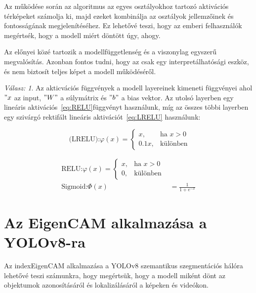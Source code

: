 \documentclass[12pt,oneside,a4paper]{article}
\newcommand{\newsection}[1]{\clearpage\section{#1}}\label{makro}
\theoremstyle{remark}
\newtheorem*{remarkth}{Válasz: \newline}
\newenvironment{remark}{\begin{remarkth}}{\end{remarkth}}
\begin{document}
    Az  működése során az algoritmus az egyes osztályokhoz tartozó aktivációs térképeket számolja ki,
     majd ezeket kombinálja az osztályok jellemzőinek és fontosságának megjelenítéséhez.
    Ez lehetővé teszi, hogy az emberi felhasználók megértsék, hogy a modell miért döntött úgy, ahogy.

    Az  előnyei közé tartozik a modellfüggetlenség és a viszonylag egyszerű megvalósítás.
     Azonban fontos tudni, hogy az  csak egy interpretálhatósági eszköz, és nem biztosít teljes képet
     a modell működéséről.
    \begin{remark}
        Az akticvációs függvények a modell layereinek kimeneti függvényei ahol \("x\) az input, \("W"\) a súlymátrix és \("b"\) a
    bias vektor.
        Az utolsó layerben egy lineáris aktivációs~\eqref{eq:RELU}\label{alignhivatkozas} függvényt használunk, míg az összes többi layerben egy
    szivárgó rektifált lineáris aktivációt~\eqref{eq:LRELU}\label{eqhivatkozas} használunk:
    \end{remark}
    \begin{equation}
        \text{ (LRELU):}
    \varphi(x) = \begin{cases}
      x, & \text{ha } x > 0 \\
      0.1x, & \text{különben}
    \end{cases}\label{eq:LRELU}
    \end{equation}\label{eq:activation_functions}


    \begin{align}
    \text{RELU:}
    \varphi(x)=\begin{cases}
      x, & \text{ha } x > 0 \\
      0, & \text{különben} \end{cases}\label{eq:RELU} \\
    \text{Sigmoid:}
    \varPhi(x) &= \frac{1}{1 + e^{-x}} \label{eq:Sigmoid}
    \end{align}



\newsection{Az EigenCAM alkalmazása a YOLOv8-ra}\label{sec:az-eigencam-alkalmazasa-a-yolov8-ra}
    Az index{EigenCAM} alkalmazása a YOLOv8 szemantikus szegmentációs hálóra lehetővé teszi számunkra, hogy megértsük,
    hogy a modell miként dönt az objektumok azonosításáról és lokalizálásáról a képeken és videókon.
\end{document}
